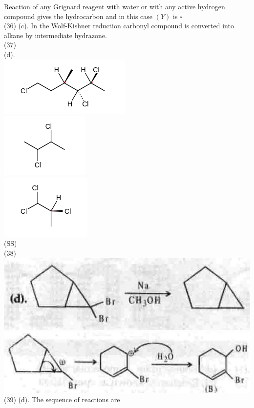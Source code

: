 \documentclass[10pt]{article}
\begin{document}
Reaction of any Grignard reagent with water or with any active hydrogen compound gives the hydrocarbon and in this case $(Y)$ is $\square$\\
(36) (c). In the Wolf-Kishner reduction carbonyl compound is converted into alkane by intermediate hydrazone.\\
(37)\\
(d).\\
\includegraphics{smile-df25fde994f416e6854a59c8bd857d55a4ef73fe}\\
\includegraphics{smile-88ccf3b14f13cc7570d65a02fe5b8ec517c76340}\\
\includegraphics{smile-c44cf6520504e42d14999d28e6d72a11bed569a2}\\
(SS)\\
(38)\\
\includegraphics[max width=\textwidth, center]{2025_01_28_8470952b98110cec3aabg-242(1)}\\
\includegraphics[max width=\textwidth, center]{2025_01_28_8470952b98110cec3aabg-242(4)}\\
(39) (d). The sequence of reactions are
\end{document}
